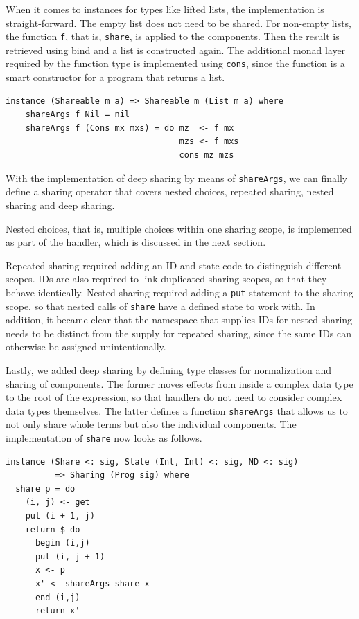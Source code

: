 \documentclass[a4paper, 11pt, fleqn, twoside]{scrreprt}
\newcommand{\hinl}[1]{\texttt{#1}}
\begin{document}
When it comes to instances for types like lifted lists, the implementation is straight-forward.
The empty list does not need to be shared.
For non-empty lists, the function \hinl{f}, that is, \hinl{share}, is applied to the components.
Then the result is retrieved using bind and a list is constructed again.
The additional monad layer required by the function type is implemented using \hinl{cons}, since the function is a smart constructor for a program that returns a list.

\begin{verbatim}
instance (Shareable m a) => Shareable m (List m a) where
    shareArgs f Nil = nil
    shareArgs f (Cons mx mxs) = do mz  <- f mx
                                   mzs <- f mxs
                                   cons mz mzs
\end{verbatim}

With the implementation of deep sharing by means of \hinl{shareArgs}, we can finally define a sharing operator that covers nested choices, repeated sharing, nested sharing and deep sharing.

Nested choices, that is, multiple choices within one sharing scope, is implemented as part of the handler, which is discussed in the next section.

Repeated sharing required adding an ID and state code to distinguish different scopes.
IDs are also required to link duplicated sharing scopes, so that they behave identically.
Nested sharing required adding a \hinl{put} statement to the sharing scope, so that nested calls of \hinl{share} have a defined state to work with.
In addition, it became clear that the namespace that supplies IDs for nested sharing needs to be distinct from the supply for repeated sharing, since the same IDs can otherwise be assigned unintentionally.

Lastly, we added deep sharing by defining type classes for normalization and sharing of components.
The former moves effects from inside a complex data type to the root of the expression, so that handlers do not need to consider complex data types themselves.
The latter defines a function \hinl{shareArgs} that allows us to not only share whole terms but also the individual components.
The implementation of \hinl{share} now looks as follows.

\begin{verbatim}
instance (Share <: sig, State (Int, Int) <: sig, ND <: sig) 
          => Sharing (Prog sig) where
  share p = do
    (i, j) <- get
    put (i + 1, j)
    return $ do
      begin (i,j)
      put (i, j + 1)
      x <- p
      x' <- shareArgs share x
      end (i,j)
      return x'
\end{verbatim}
\end{document}
